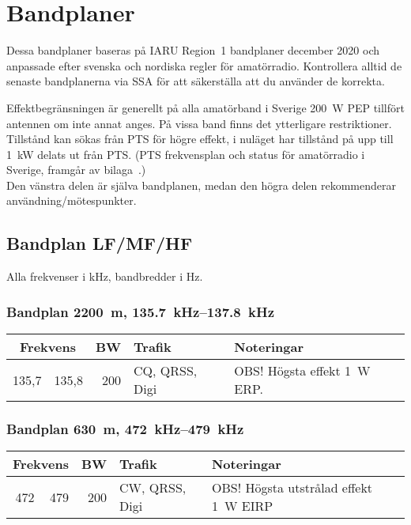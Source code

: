 \onecolumn

\chapter{Bandplaner}
\label{bandplaner2}
\label{IARU bandplan}
\label{HFbandplan}

\noindent Dessa bandplaner baseras på IARU Region~1 bandplaner december 2020
\cite{IARU1} och anpassade efter svenska och nordiska regler för amatörradio.
Kontrollera alltid de senaste bandplanerna via SSA för att säkerställa att du
använder de korrekta.

Effektbegränsningen är generellt på alla amatörband i Sverige \qty{200}{\watt}
PEP tillfört antennen om inte annat anges.
På vissa band finns det ytterligare restriktioner.
Tillstånd kan sökas från PTS för högre effekt, i nuläget har tillstånd på upp
till \qty{1}{\kilo\watt} delats ut från PTS.
(PTS frekvensplan och status för amatörradio i Sverige, framgår av
bilaga~.)\\

Den vänstra delen är själva bandplanen, medan den högra delen rekommenderar
användning/mötespunkter.

\section{Bandplan LF/MF/HF}

Alla frekvenser i \unit{\kilo\hertz}, bandbredder i \unit{\hertz}.

\subsection{Bandplan \qty{2200}{\metre}, \SIrange{135,7}{137,8}{\kilo\hertz}}
\begin{tabular}{rrrll}
\multicolumn{2}{c}{\textbf{Frekvens}} & \textbf{BW} & \textbf{Trafik} & \textbf{Noteringar} \\ \hline
135,7 & 135,8 & 200 & CQ, QRSS, Digi & OBS! Högsta effekt \qty{1}{W} ERP. \\
\end{tabular}

\subsection{Bandplan \qty{630}{\metre}, \SIrange{472}{479}{\kilo\hertz}}
\begin{tabular}{rrrll}
\multicolumn{2}{c}{\textbf{Frekvens}} & \textbf{BW} & \textbf{Trafik} & \textbf{Noteringar} \\ \hline
472 & 479 & 200 & CW, QRSS, Digi & OBS! Högsta utstrålad effekt \qty{1}{W} EIRP \\
\end{tabular}

